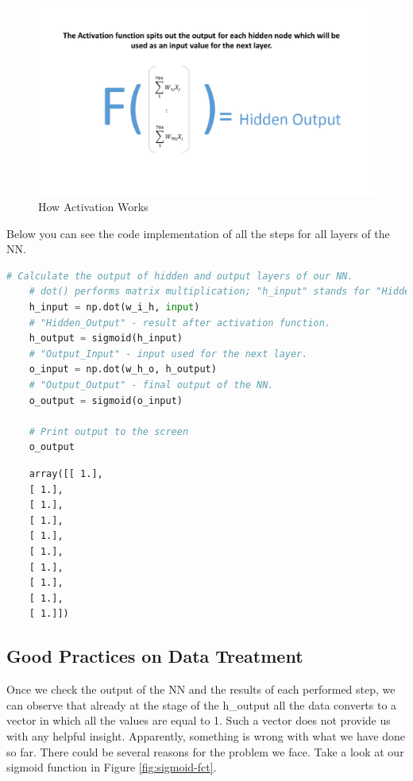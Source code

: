 \begin{figure}[H]
    \includegraphics[width=\linewidth]{pics/activation.jpg}
    \caption{\label{fig:activation} How Activation Works}
\end{figure}

Below you can see the code implementation of all the steps for all layers of the NN.

\begin{lstlisting}[language=Python]
    # Calculate the output of hidden and output layers of our NN.
    # dot() performs matrix multiplication; "h_input" stands for "Hidden_Input".
    h_input = np.dot(w_i_h, input) 
    # "Hidden_Output" - result after activation function.
    h_output = sigmoid(h_input) 
    # "Output_Input" - input used for the next layer.
    o_input = np.dot(w_h_o, h_output)
    # "Output_Output" - final output of the NN.
    o_output = sigmoid(o_input)

    # Print output to the screen
    o_output 
\end{lstlisting}

\begin{lstlisting}
    array([[ 1.],
    [ 1.],
    [ 1.],
    [ 1.],
    [ 1.],
    [ 1.],
    [ 1.],
    [ 1.],
    [ 1.],
    [ 1.]])
\end{lstlisting}

\subsection{Good Practices on Data Treatment}

Once we check the output of the NN and the results of each performed step, we can observe that already at the stage of the h\_output all the data converts to a vector in which all the values are equal to 1. Such a vector does not provide us with any helpful insight. Apparently, something is wrong with what we have done so far. There could be several reasons for the problem we face. Take a look at our sigmoid function in Figure \ref{fig:sigmoid-fct}.

